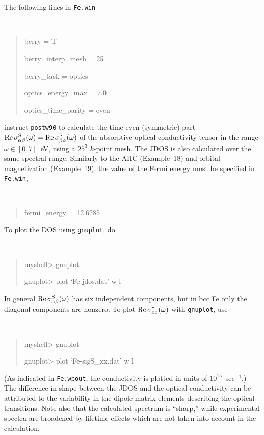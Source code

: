 \documentclass[a4paper,11pt,twoside]{article}
\begin{document}
The following lines in {\tt Fe.win}
%
{\tt
\begin{quote}
berry = T

berry\_interp\_mesh = 25

berry\_task = optics

optics\_energy\_max = 7.0

optics\_time\_parity = even 

\end{quote} }
%
instruct {\tt postw90} to calculate the time-even (symmetric) part
${\rm Re}\,\sigma^{\rm S}_{\alpha\beta}(\omega)={\rm Re}\,\sigma^{\rm
  S}_{\beta\alpha}(\omega)$ of the absorptive optical conductivity
tensor in the range $\omega\in [0,7]$~eV, using a $25^3$ $k$-point
mesh. The JDOS is also calculated over the same spectral
range. Similarly to the AHC (Example~18) and orbital magnetization
(Example~19), the value of the Fermi energy must be specified in {\tt
  Fe.win},
%
{\tt
\begin{quote}
fermi\_energy = 12.6285
\end{quote}
}

To plot the DOS using {\tt gnuplot}, do
%
{\tt
\begin{quote}
myshell> gnuplot

gnuplot> plot `Fe-jdos.dat' w l
\end{quote} }

In general ${\rm Re}\,\sigma^{\rm S}_{\alpha\beta}(\omega)$ has six independent
components, but in bcc Fe only the diagonal components are nonzero. 
To plot ${\rm Re}\,\sigma^{\rm S}_{xx}(\omega)$ with {\tt gnuplot},
use
%
{\tt
\begin{quote} myshell> gnuplot

gnuplot> plot `Fe-sigS\_xx.dat' w l
\end{quote} }
%
(As indicated in {\tt Fe.wpout}, the conductivity is plotted in units
of $10^{15}$~sec$^{-1}$.) The difference in shape between the JDOS and
the optical conductivity can be attributed to the variability in the
dipole matrix elements describing the optical transitions.  Note also
that the calculated spectrum is ``sharp,'' while experimental spectra
are broadened by lifetime effects which are not taken into account in
the calculation.
\end{document}
